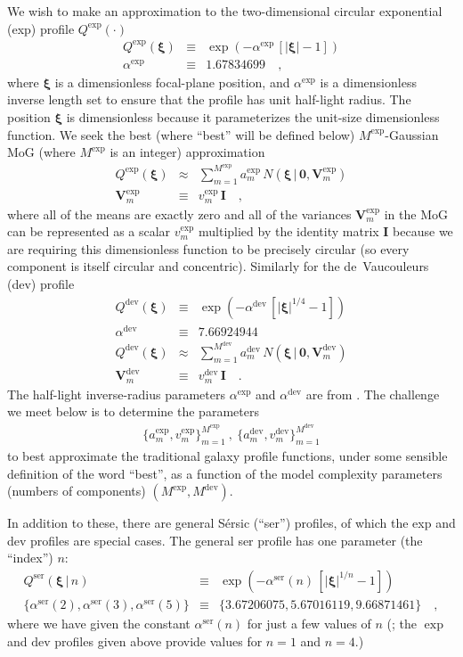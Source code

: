 \documentclass[12pt,pdftex,preprint]{aastex}
\newcommand{\tmatrix}[1]{\boldsymbol{#1}}
\newcommand{\tvector}[1]{\boldsymbol{#1}}
\newcommand{\spos}{\tvector{\xi}}
\newcommand{\var}{\tmatrix{V}}
\newcommand{\zero}{\tmatrix{0}}
\newcommand{\identity}{\tmatrix{I}}
\newcommand{\normal}{N}
\newcommand{\given}{\,|\,}
\newcommand{\dev}{\mathrm{dev}}
\newcommand{\ser}{\mathrm{ser}}
\begin{document}
We wish to make an approximation to the two-dimensional circular
exponential (exp) profile $Q^{\exp}(\cdot)$
\begin{eqnarray}\displaystyle
Q^{\exp}(\spos) &\equiv& \exp(-\alpha^{\exp}\,[|\spos| - 1])
\\
\alpha^{\exp} &\equiv& 1.67834699
\quad ,
\end{eqnarray}
where $\spos$ is a dimensionless focal-plane position, and
$\alpha^{\exp}$ is a dimensionless inverse length set to ensure that
the profile has unit half-light radius.  The position $\spos$ is
dimensionless because it parameterizes the unit-size dimensionless
function.  We seek the best (where ``best'' will be defined below)
$M^{\exp}$-Gaussian MoG (where $M^{\exp}$ is an integer) approximation
\begin{eqnarray}\displaystyle
Q^{\exp}(\spos) &\approx& \sum_{m=1}^{M^{\exp}} a^{\exp}_m\,\normal(\spos\given\zero,\var^{\exp}_m)
\\
\var^{\exp}_m &\equiv& v^{\exp}_m\,\identity
\quad ,
\end{eqnarray}
where all of the means are exactly zero and all of the variances
$\var^{\exp}_m$ in the MoG can be represented as a scalar
$v^{\exp}_m$ multiplied by the identity matrix $\identity$
because we are requiring this dimensionless function to be precisely
circular (so every component is itself circular and concentric).
Similarly for the de~Vaucouleurs (dev) profile
\begin{eqnarray}\displaystyle
Q^{\dev}(\spos) &\equiv& \exp(-\alpha^{\dev}\,[|\spos|^{1/4} - 1])
\\
\alpha^{\dev} &\equiv& 7.66924944
\\
Q^{\dev}(\spos) &\approx& \sum_{m=1}^{M^{\dev}} a^{\dev}_m\,\normal(\spos\given\zero,\var^{\dev}_m)
\\
\var^{\dev}_m &\equiv& v^{\dev}_m\,\identity
\quad .
\end{eqnarray}
The half-light inverse-radius parameters $\alpha^{\exp}$ and
$\alpha^{\dev}$ are from \citet{ciotti}.  The challenge we
meet below is to determine the parameters
\begin{eqnarray}
\{a^{\exp}_m,v^{\exp}_m\}_{m=1}^{M^{\exp}}~,~\{a^{\dev}_m,v^{\dev}_m\}_{m=1}^{M^{\dev}}
\end{eqnarray}
to best approximate the traditional galaxy profile functions, under
some sensible definition of the word ``best'', as a function of the
model complexity parameters (numbers of components) $(M^{\exp},
M^{\dev})$.

In addition to these, there are general S\'ersic (``ser'') profiles, of
which the exp and dev profiles are special cases.  The general ser
profile has one parameter (the ``index'') $n$:
\begin{eqnarray}\displaystyle
Q^{\ser}(\spos\given n) &\equiv& \exp(-\alpha^{\ser}(n)\,[|\spos|^{1/n} - 1])
\\
\{\alpha^{\ser}(2), \alpha^{\ser}(3), \alpha^{\ser}(5)\} &\equiv& \{3.67206075, 5.67016119, 9.66871461\}
\quad ,
\end{eqnarray}
where we have given the constant $\alpha^{\ser}(n)$ for just a few
values of $n$ (\citealt{ciotti}; the $\exp$ and $\dev$ profiles given
above provide values for $n=1$ and $n=4$.)
\end{document}
